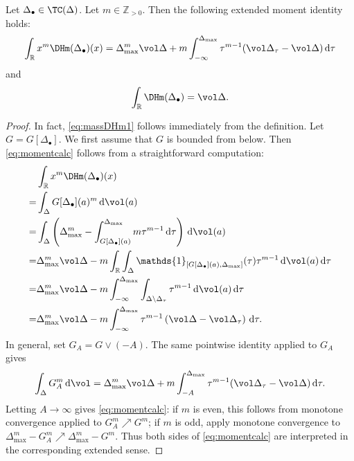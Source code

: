 \begin{proposition}\label{prop:DHmoments}
    Let $\Delta_{\bullet}\in \TC(\Delta)$. Let $m\in \mathbb{Z}_{>0}$. Then the following extended moment identity holds:
    \begin{equation}\label{eq:momentcalc}
\int_{\mathbb{R}}x^m \DHm(\Delta_{\bullet})(x)=\Delta_{\max}^m\vol\Delta+m\int_{-\infty}^{\Delta_{\max}} \tau^{m-1}(\vol \Delta_{\tau}-\vol \Delta)\,\mathrm{d}\tau
    \end{equation}
and
\begin{equation}\label{eq:massDHm1}
\int_{\mathbb{R}}\DHm(\Delta_{\bullet})=\vol \Delta.
\end{equation}
\end{proposition}
\begin{proof}
In fact, \eqref{eq:massDHm1} follows immediately from the definition. Let $G=G[\Delta_{\bullet}]$. We first assume that $G$ is bounded from below. Then \eqref{eq:momentcalc} follows from a straightforward computation:
\[
\begin{aligned}
    &\int_{\mathbb{R}}x^m \DHm(\Delta_{\bullet})(x)\\
    =& \int_{\Delta} G[\Delta_{\bullet}](a)^m\,\mathrm{d}\vol(a)\\
    =& \int_{\Delta} \left( \Delta_{\max}^m-\int_{G[\Delta_{\bullet}](a)}^{\Delta_{\max}} m\tau^{m-1}\,\mathrm{d}\tau\right)\,\mathrm{d}\vol(a)\\
    =& \Delta_{\max}^m\vol \Delta-m\int_{\mathbb{R}}\int_{\Delta} \mathds{1}_{[G[\Delta_{\bullet}](a),\Delta_{\max}]}(\tau)\tau^{m-1}\,\mathrm{d}\vol(a)\,\mathrm{d}\tau\\
    =& \Delta_{\max}^m\vol \Delta-m\int_{-\infty}^{\Delta_{\max}}\int_{\Delta\setminus \Delta_{\tau}} \tau^{m-1}\,\mathrm{d}\vol(a)\,\mathrm{d}\tau\\
    =& \Delta_{\max}^m\vol \Delta-m\int_{-\infty}^{\Delta_{\max}} \tau^{m-1}\left(\vol \Delta-\vol \Delta_{\tau}\right)\,\mathrm{d}\tau.
\end{aligned}
\]
In general, set $G_A=G\lor (-A)$. The same pointwise identity applied to $G_A$ gives
\[
\int_{\Delta}G_A^m\,\mathrm{d}\vol=\Delta_{\max}^m\vol\Delta
+m\int_{-A}^{\Delta_{\max}}\tau^{m-1}(\vol \Delta_{\tau}-\vol\Delta)\,\mathrm{d}\tau.
\]
Letting $A\to\infty$ gives \eqref{eq:momentcalc}: if $m$ is even, this follows from monotone convergence applied to $G_A^m\nearrow G^m$; if $m$ is odd, apply monotone convergence to $\Delta_{\max}^m-G_A^m\nearrow \Delta_{\max}^m-G^m$. Thus both sides of \eqref{eq:momentcalc} are interpreted in the corresponding extended sense.
\end{proof}



